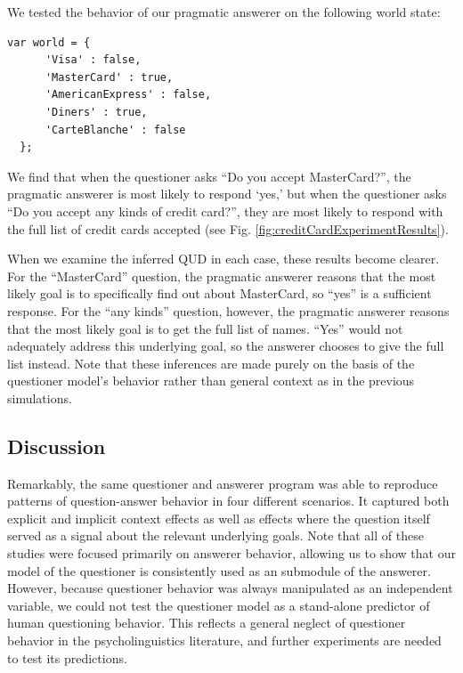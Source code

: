 \documentclass[12pt, floatsintext, man]{apa6}
\begin{document}
We tested the behavior of our pragmatic answerer on the following world state:

\begin{lstlisting}
var world = {
      'Visa' : false,
      'MasterCard' : true,
      'AmericanExpress' : false,
      'Diners' : true,
      'CarteBlanche' : false
  };
\end{lstlisting}

We find that when the questioner asks ``Do you accept MasterCard?'', the pragmatic answerer is most likely to respond `yes,' but when the questioner asks ``Do you accept any kinds of credit card?'', they are most likely to respond with the full list of credit cards accepted (see Fig. \ref{fig:creditCardExperimentResults}). 

When we examine the inferred QUD in each case, these results become clearer. For the ``MasterCard'' question, the pragmatic answerer reasons that the most likely goal is to specifically find out about MasterCard, so ``yes'' is a sufficient response. For the ``any kinds'' question, however, the pragmatic answerer reasons that the most likely goal is to get the full list of names. ``Yes'' would not adequately address this underlying goal, so the answerer chooses to give the full list instead. Note that these inferences are made purely on the basis of the questioner model's behavior rather than general context as in the previous simulations.

\subsection{Discussion}

Remarkably, the same questioner and answerer program was able to reproduce patterns of question-answer behavior in four different scenarios. It captured both explicit and implicit context effects as well as effects where the question itself served as a signal about the relevant underlying goals. Note that all of these studies were focused primarily on answerer behavior, allowing us to show that our model of the questioner is consistently used as an submodule of the answerer. However, because questioner behavior was always manipulated as an independent variable, we could not test the questioner model as a stand-alone predictor of human questioning behavior. This reflects a general neglect of questioner behavior in the psycholinguistics literature, and further experiments are needed to test its predictions. 
\end{document}

